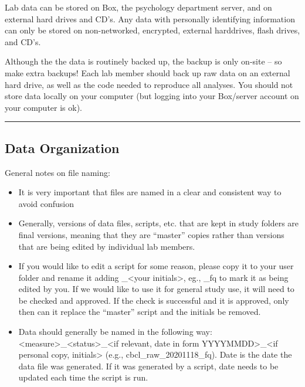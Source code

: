 \documentclass[]{book}
\providecommand{\tightlist}{%
  \setlength{\itemsep}{0pt}\setlength{\parskip}{0pt}}
\begin{document}
Lab data can be stored on Box, the psychology department server, and on
external hard drives and CD's. Any data with personally identifying
information can only be stored on non-networked, encrypted, external
harddrives, flash drives, and CD's.

Although the the data is routinely backed up, the backup is only on-site
-- so make extra backups! Each lab member should back up raw data on an
external hard drive, as well as the code needed to reproduce all
analyses. You should not store data locally on your computer (but
logging into your Box/server account on your computer is ok).

\begin{center}\rule{0.5\linewidth}{0.5pt}\end{center}

\subsection{Data Organization}\label{data-organization}

General notes on file naming:

\begin{itemize}
\tightlist
\item
  It is very important that files are named in a clear and consistent
  way to avoid confusion
\item
  Generally, versions of data files, scripts, etc. that are kept in
  study folders are final versions, meaning that they are ``master''
  copies rather than versions that are being edited by individual lab
  members.
\item
  If you would like to edit a script for some reason, please copy it to
  your user folder and rename it adding \_\textless{}your
  initials\textgreater{}, eg., \_fq to mark it as being edited by you.
  If we would like to use it for general study use, it will need to be
  checked and approved. If the check is successful and it is approved,
  only then can it replace the ``master'' script and the initials be
  removed.
\item
  Data should generally be named in the following way:
  \textless{}measure\textgreater{}\_\textless{}status\textgreater{}\_\textless{}if
  relevant, date in form YYYYMMDD\textgreater{}\_\textless{}if personal
  copy, initials\textgreater{} (e.g., cbcl\_raw\_20201118\_fq). Date is
  the date the data file was generated. If it was generated by a script,
  date needs to be updated each time the script is run.
\end{itemize}
\end{document}

